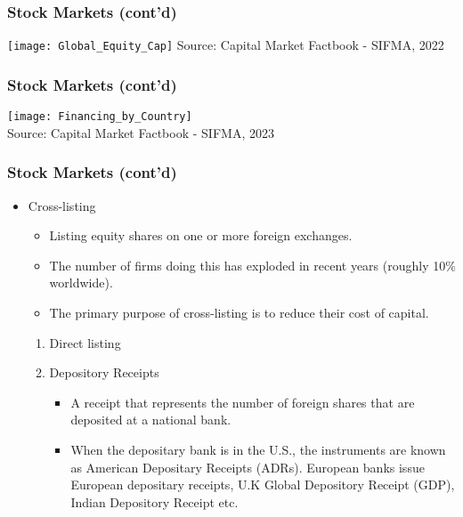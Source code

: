 \documentclass[10pt]{beamer}
\begin{document}
	
	
	\begin{frame}
		\frametitle{Stock Markets (cont'd)} %
		\begin{center}
			\texttt{[image: Global\_Equity\_Cap]}
			{\scriptsize Source: Capital Market Factbook - SIFMA, 2022}		
		\end{center}
		
	\end{frame}	
	
	
	
	\begin{frame}
		\frametitle{Stock Markets (cont'd)} %
		\begin{center}
			\texttt{[image: Financing\_by\_Country]} \\
			{\scriptsize Source: Capital Market Factbook - SIFMA, 2023}		
		\end{center}
		
	\end{frame}	
	
	
	\begin{frame}
		\frametitle{Stock Markets (cont'd)}
		
		\begin{itemize} \vspace{5pt} \itemsep10pt
			\item Cross-listing
			\begin{itemize} \vspace{5pt} \itemsep10pt
				\item Listing equity shares on one or more foreign exchanges.
				\item The number of firms doing this has exploded in recent years (roughly 10\% worldwide).
				\item The primary purpose of cross-listing is to reduce their cost of capital. 	
			\end{itemize}
			
			\begin{enumerate} \vspace{5pt} \itemsep10pt
				\item Direct listing
				\item Depository Receipts
				\begin{itemize} \vspace{5pt} \itemsep10pt
					\item A receipt that represents the number of foreign shares that are deposited at a national bank.
					\item When the depositary bank is in the U.S., the instruments are known as American Depositary Receipts (ADRs). European banks issue European depositary receipts, U.K Global Depository Receipt (GDP), Indian Depository Receipt  etc.
					
				\end{itemize} 
			\end{enumerate}
			
		\end{itemize}
		
	\end{frame}
	
\end{document}
